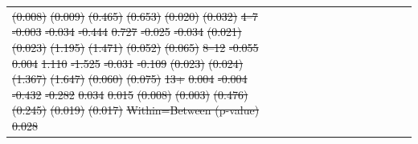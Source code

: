 \documentclass[12pt,english]{article}
\providecommand{\DIFdeltex}[1]{{\protect\color{red}\sout{#1}}}                      %
\providecommand{\DIFdelFL}[1]{\DIFdel{#1}} %
\providecommand{\DIFdel}[1]{\texorpdfstring{\DIFdeltex{#1}}{}} %
\begin{document}
\begin{table}[!ht]
\begin{center}
\begin{adjustbox}{max width=.9\linewidth}
\begin{threeparttable}
{\begin{tabular}{l*{6}{S S}}
\DIFdelFL{(0.008)         }%
\DIFdelFL{(0.009)         }%
\DIFdelFL{(0.465)         }%
\DIFdelFL{(0.653)         }%
\DIFdelFL{(0.020)         }%
\DIFdelFL{(0.032)         }%
\DIFdelFL{4--7 }%
\DIFdelFL{-0.003         }%
\DIFdelFL{-0.034         }%
\DIFdelFL{-0.444         }%
\DIFdelFL{0.727         }%
\DIFdelFL{-0.025         }%
\DIFdelFL{-0.034         }%
\DIFdelFL{(0.021)         }%
\DIFdelFL{(0.023)         }%
\DIFdelFL{(1.195)         }%
\DIFdelFL{(1.471)         }%
\DIFdelFL{(0.052)         }%
\DIFdelFL{(0.065)         }%
\DIFdelFL{8--12 }%
\DIFdelFL{-0.055}%
\DIFdelFL{0.004         }%
\DIFdelFL{1.110         }%
\DIFdelFL{-1.525         }%
\DIFdelFL{-0.031         }%
\DIFdelFL{-0.109         }%
\DIFdelFL{(0.023)         }%
\DIFdelFL{(0.024)         }%
\DIFdelFL{(1.367)         }%
\DIFdelFL{(1.647)         }%
\DIFdelFL{(0.060)         }%
\DIFdelFL{(0.075)         }%
\DIFdelFL{13+ }%
\DIFdelFL{0.004         }%
\DIFdelFL{-0.004         }%
\DIFdelFL{-0.432         }%
\DIFdelFL{-0.282         }%
\DIFdelFL{0.034}%
\DIFdelFL{0.015         }%
\DIFdelFL{(0.008)         }%
\DIFdelFL{(0.003)         }%
\DIFdelFL{(0.476)         }%
\DIFdelFL{(0.245)         }%
\DIFdelFL{(0.019)         }%
\DIFdelFL{(0.017)         }%
\DIFdelFL{Within=Between (p-value)}%
\DIFdelFL{0.028         }%

\end{tabular}}
\end{threeparttable}
\end{adjustbox}
\end{center}
\end{table}
\end{document}
